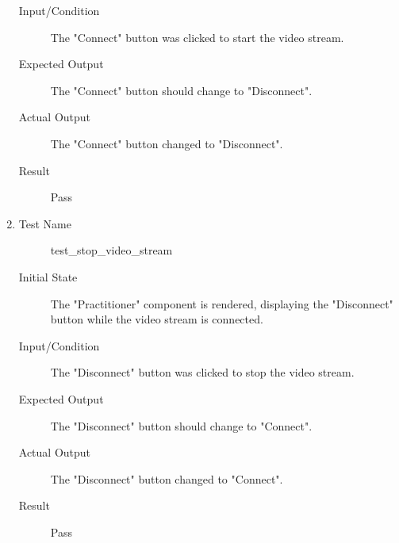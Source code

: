 \documentclass[12pt, titlepage]{article}
\begin{document}
\begin{enumerate}[UT-PV1]
\begin{description}
  \item[Input/Condition] The "Connect" button was clicked to start the video
    stream.
  \item[Expected Output] The "Connect" button should change to "Disconnect".
  \item[Actual Output] The "Connect" button changed to "Disconnect".
  \item[Result] Pass
  \end{description}
\item \label{UT-PV4}
  \begin{description}
  \item[Test Name] test\_stop\_video\_stream
  \item[Initial State] The "Practitioner" component is rendered, displaying the
    "Disconnect" button while the video stream is connected.
  \item[Input/Condition] The "Disconnect" button was clicked to stop the video
    stream.
  \item[Expected Output] The "Disconnect" button should change to "Connect".
  \item[Actual Output] The "Disconnect" button changed to "Connect".
  \item[Result] Pass
  \end{description}
\end{enumerate}
\end{document}
